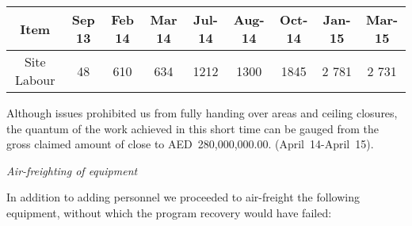 \begin{table}[hbp]
\begin{tabular}{c c c c c c c c c}
\toprule
Item &Sep 13 &Feb 14 &Mar 14 & Jul-14 & Aug-14 &Oct-14 & Jan-15 & Mar-15\\
\midrule
 Site Labour   & 48      &610      & 634     & 1212   &  1300     & 1845   &2 781   & 2 731 \\
\bottomrule
\end{tabular}
\end{table}

Although issues prohibited us from fully handing over areas and ceiling closures, the quantum of the work achieved in this short time can be gauged from the gross claimed amount of close to AED~280,000,000.00. (April~14-April~15). 
\medskip

\noindent\textit{Air-freighting of equipment}
\medskip

\noindent In addition to adding personnel we proceeded to air-freight the following equipment, without which the program recovery would have failed:

